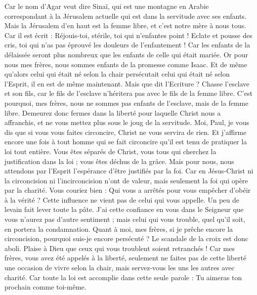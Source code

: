 \begin{multicols}{2}
Car le nom d'Agar veut dire Sinaï, qui est une montagne en Arabie correspondant à la Jérusalem actuelle qui est dans la servitude avec ses enfants.
Mais la Jérusalem d'en haut est la femme libre, et c'est notre mère à nous tous.
Car il est écrit : Réjouis-toi, stérile, toi qui n’enfantes point ! Eclate et pousse des cris, toi qui n’as pas éprouvé les douleurs de l’enfantement ! Car les enfants de la délaissée seront plus nombreux que les enfants de celle qui était mariée.
Or pour nous mes frères, nous sommes enfants de la promesse comme Isaac.
Et de même qu’alors celui qui était né selon la chair persécutait celui qui était né selon l'Esprit, il en est de même maintenant.
Mais que dit l'Ecriture ? Chasse l’esclave et son fils, car le fils de l’esclave n’héritera pas avec le fils de la femme libre.
C’est pourquoi, mes frères, nous ne sommes pas enfants de l’esclave, mais de la femme libre.
\VerseOne{}Demeurez donc fermes dans la liberté pour laquelle Christ nous a affranchis, et ne vous mettez plus sous le joug de la servitude.
Moi, Paul, je vous dis que si vous vous faites circoncire, Christ ne vous servira de rien.
Et j’affirme encore une fois à tout homme qui se fait circoncire qu’il est tenu de pratiquer la loi tout entière.
Vous êtes séparés de Christ, vous tous qui cherchez la justification dans la loi ; vous êtes déchus de la grâce.
Mais pour nous, nous attendons par l'Esprit l’espérance d'être justifiés par la foi.
Car en Jésus-Christ ni la circoncision ni l’incirconcision n'ont de valeur, mais seulement la foi qui opère par la charité.
Vous couriez bien : Qui vous a arrêtés pour vous empêcher d'obéir à la vérité ?
Cette influence ne vient pas de celui qui vous appelle.
Un peu de levain fait lever toute la pâte.
J’ai cette confiance en vous dans le Seigneur que vous n'aurez pas d'autre sentiment ; mais celui qui vous trouble, quel qu'il soit, en portera la condamnation.
Quant à moi, mes frères, si je prêche encore la circoncision, pourquoi suis-je encore persécuté ? Le scandale de la croix est donc aboli.
Plaise à Dieu que ceux qui vous troublent soient retranchés !
Car mes frères, vous avez été appelés à la liberté, seulement ne faites pas de cette liberté une occasion de vivre selon la chair, mais servez-vous les uns les autres avec charité.
Car toute la loi est accomplie dans cette seule parole : Tu aimeras ton prochain comme toi-même.

\end{multicols}
